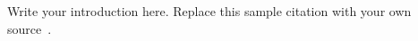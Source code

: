 
Write your introduction here. Replace this sample citation with your own source~\cite{website:google}.

\EndChapter

